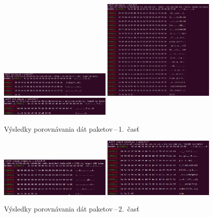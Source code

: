 \documentclass[a4paper, 11pt, twocolumn]{article}
\begin{document}
        \begin{figure}[hb]
            \centering
            \includegraphics[width=0.48\textwidth]{img/tcp.png}
            \includegraphics[width=0.48\textwidth]{img/udp.png}
            \includegraphics[width=0.48\textwidth]{img/arp.png}
            \caption{Výsledky porovnávania dát paketov\,--\,1.~časť}
            \label{fig:fig1}
        \end{figure}
        \begin{figure}[ht]
            \includegraphics[width=0.48\textwidth]{img/icmpv6.png}
            \includegraphics[width=0.48\textwidth]{img/icmpv4.png}
            \caption{Výsledky porovnávania dát paketov\,--\,2.~časť}
            \label{fig:fig2}
        \end{figure}
        


\end{document}
